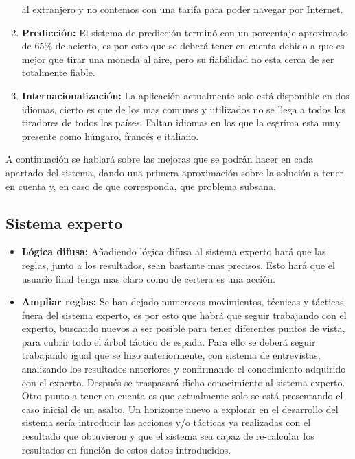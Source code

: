 \begin{enumerate}
    al extranjero y no contemos con una tarifa para poder navegar por Internet.
  \item \textbf{Predicción:} El sistema de predicción terminó con un porcentaje
    aproximado de 65\% de acierto, es por esto que se deberá tener en cuenta
    debido a que es mejor que tirar una moneda al aire, pero su fiabilidad
    no esta cerca de ser totalmente fiable.
  \item \textbf{Internacionalización:} La aplicación actualmente solo está
    disponible en dos idiomas, cierto es que de los mas comunes y utilizados
    no se llega a todos los tiradores de todos los países. Faltan idiomas
    en los que la esgrima esta muy presente como húngaro, francés e italiano.
\end{enumerate}

A continuación se hablará sobre las mejoras que se podrán hacer en cada apartado
del sistema, dando una primera aproximación sobre la solución a tener en cuenta y,
en caso de que corresponda, que problema subsana.

\subsection{Sistema experto}

\begin{itemize}
  \item \textbf{Lógica difusa:} Añadiendo lógica difusa al sistema experto hará que las reglas,
    junto a los resultados, sean bastante mas precisos. Esto hará que el usuario final
    tenga mas claro como de certera es una acción.

  \item \textbf{Ampliar reglas:} Se han dejado numerosos movimientos, técnicas y tácticas
    fuera del sistema experto, es por esto que habrá que seguir trabajando con el
    experto, buscando nuevos a ser posible para tener diferentes puntos de vista,
    para cubrir todo el árbol táctico de espada. Para ello se deberá seguir
    trabajando igual que se hizo anteriormente, con sistema de entrevistas, analizando
    los resultados anteriores y confirmando el conocimiento adquirido con el experto.
    Después se traspasará dicho conocimiento al sistema experto. Otro punto a tener
    en cuenta es que actualmente solo se está presentando el caso inicial de un
    asalto. Un horizonte nuevo a explorar en el desarrollo del sistema sería
    introducir las acciones y/o tácticas ya realizadas con el resultado que obtuvieron
    y que el sistema sea capaz de re-calcular los resultados en función de estos
    datos introducidos.
\end{itemize}

